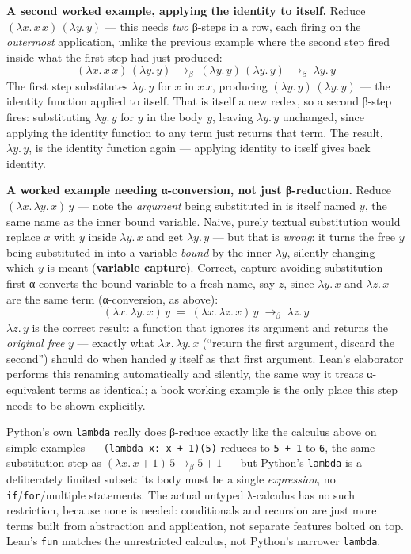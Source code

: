 \textbf{A second worked example, applying the identity to itself.} Reduce \((\lambda x.\, x\, x)\, (\lambda y.\, y)\) --- this needs \emph{two} β-steps in a row, each firing on the \emph{outermost} application, unlike the previous example where the second step fired inside what the first step had just produced: \[
(\lambda x.\, x\, x)\, (\lambda y.\, y)
\;\longrightarrow_\beta\; (\lambda y.\, y)\, (\lambda y.\, y)
\;\longrightarrow_\beta\; \lambda y.\, y
\] The first step substitutes \(\lambda y.\, y\) for \(x\) in \(x\, x\), producing \((\lambda y.\, y)\, (\lambda y.\, y)\) --- the identity function applied to itself. That is itself a new redex, so a second β-step fires: substituting \(\lambda y.\, y\) for \(y\) in the body \(y\), leaving \(\lambda y.\, y\) unchanged, since applying the identity function to any term just returns that term. The result, \(\lambda y.\, y\), is the identity function again --- applying identity to itself gives back identity.

\textbf{A worked example needing α-conversion, not just β-reduction.} Reduce \((\lambda x.\, \lambda y.\, x)\, y\) --- note the \emph{argument} being substituted in is itself named \(y\), the same name as the inner bound variable. Naive, purely textual substitution would replace \(x\) with \(y\) inside \(\lambda y.\, x\) and get \(\lambda y.\, y\) --- but that is \emph{wrong}: it turns the free \(y\) being substituted in into a variable \emph{bound} by the inner \(\lambda y\), silently changing which \(y\) is meant (\textbf{variable capture}). Correct, capture-avoiding substitution first α-converts the bound variable to a fresh name, say \(z\), since \(\lambda y.\, x\) and \(\lambda z.\, x\) are the same term (α-conversion, as above): \[
(\lambda x.\, \lambda y.\, x)\, y
\;=\; (\lambda x.\, \lambda z.\, x)\, y
\;\longrightarrow_\beta\; \lambda z.\, y
\] \(\lambda z.\, y\) is the correct result: a function that ignores its argument and returns the \emph{original free} \(y\) --- exactly what \(\lambda x.\, \lambda y.\, x\) (``return the first argument, discard the second'') should do when handed \(y\) itself as that first argument. Lean's elaborator performs this renaming automatically and silently, the same way it treats α-equivalent terms as identical; a book working example is the only place this step needs to be shown explicitly.

\begin{progcorner}

Python's own \texttt{lambda} really does β-reduce exactly like the calculus above on simple examples --- \texttt{(lambda x: x + 1)(5)} reduces to \texttt{5 + 1} to \texttt{6}, the same substitution step as \((\lambda x.\, x + 1)\, 5 \to_\beta 5 + 1\) --- but Python's \texttt{lambda} is a deliberately limited subset: its body must be a single \emph{expression}, no \texttt{if}/\texttt{for}/multiple statements. The actual untyped λ-calculus has no such restriction, because none is needed: conditionals and recursion are just more terms built from abstraction and application, not separate features bolted on top. Lean's \texttt{fun} matches the unrestricted calculus, not Python's narrower \texttt{lambda}.

\end{progcorner}

